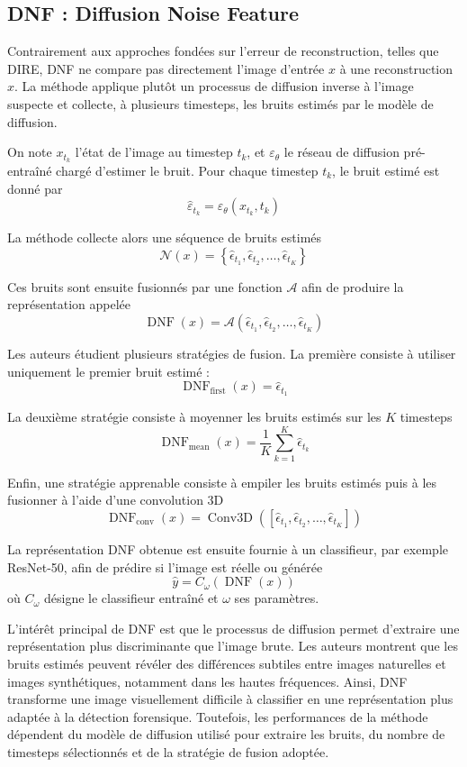 \documentclass[runningheads]{llncs}
\begin{document}
\subsection{DNF : Diffusion Noise Feature}
Contrairement aux approches fondées sur l'erreur de reconstruction, telles que DIRE\citep{Zhang_2025}, DNF ne compare pas directement l'image d'entrée $x$ à une reconstruction $\hat{x}$. La méthode applique plutôt un processus de diffusion inverse à l'image suspecte et collecte, à plusieurs timesteps, les bruits estimés par le modèle de diffusion.

On note $x_{t_k}$ l'état de l'image au timestep $t_k$, et $\varepsilon_\theta $ le réseau de diffusion pré-entraîné chargé d'estimer le bruit. Pour chaque timestep $t_k$, le bruit estimé est donné par 
$$
    \hat{\varepsilon}_{t_k}=\varepsilon_\theta(x_{t_k},t_k)
$$

La méthode collecte alors une séquence de bruits estimés 
$$
    \mathcal{N}(x)=\left\{\hat{\epsilon}_{t_1},\hat{\epsilon}_{t_2},\dots,\hat{\epsilon}_{t_K}\right\}
$$

Ces bruits sont ensuite fusionnés par une fonction $\mathcal{A}$ afin de produire la représentation appelée  
$$
    \operatorname{DNF}(x)=\mathcal{A}\left(\hat{\epsilon}_{t_1},\hat{\epsilon}_{t_2},\dots,\hat{\epsilon}_{t_K}\right)
$$

Les auteurs étudient plusieurs stratégies de fusion. La première consiste à utiliser uniquement le premier bruit estimé :
$$
    \operatorname{DNF}_{\text{first}}(x)=\hat{\epsilon}_{t_1}
$$

La deuxième stratégie consiste à moyenner les bruits estimés sur les $K$ timesteps 
$$
    \operatorname{DNF}_{\text{mean}}(x)=\frac{1}{K}\sum_{k=1}^{K}\hat{\epsilon}_{t_k}
$$

Enfin, une stratégie apprenable consiste à empiler les bruits estimés puis à les fusionner à l'aide d'une convolution 3D 
$$
    \operatorname{DNF}_{\text{conv}}(x)
=\operatorname{Conv3D}
\left(\left[\hat{\epsilon}_{t_1},\hat{\epsilon}_{t_2},\dots,\hat{\epsilon}_{t_K}\right]\right)
$$

La représentation DNF obtenue est ensuite fournie à un classifieur, par exemple ResNet-50, afin de prédire si l'image est réelle ou générée 
$$
    \hat{y}=C_\omega\left(\operatorname{DNF}(x)\right)
$$
où $C_\omega$ désigne le classifieur entraîné et $\omega$ ses paramètres.

L'intérêt principal de DNF est que le processus de diffusion permet d'extraire une représentation plus discriminante que l'image brute. Les auteurs montrent que les bruits estimés peuvent révéler des différences subtiles entre images naturelles et images synthétiques, notamment dans les hautes fréquences. Ainsi, DNF transforme une image visuellement difficile à classifier en une représentation plus adaptée à la détection forensique. Toutefois, les performances de la méthode dépendent du modèle de diffusion utilisé pour extraire les bruits, du nombre de timesteps sélectionnés et de la stratégie de fusion adoptée.
\end{document}
